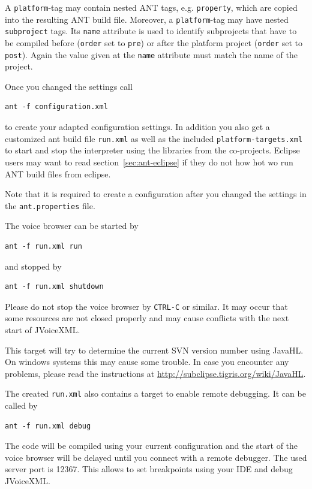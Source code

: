 \documentclass[11pt,a4paper]{article}
\begin{document}
A \lstinline{platform}-tag may contain nested ANT tags, e.g.
\lstinline{property}, which are copied into the resulting ANT build file. Moreover, a \lstinline{platform}-tag
may have nested \lstinline{subproject} tags. Its \lstinline{name} attribute
is used to identify subprojects that have to be compiled before
(\lstinline{order} set to \texttt{pre}) or after the platform project
(\lstinline{order} set to \texttt{post}). Again the value given at the
\lstinline{name} attribute must match the name of the project.

Once you changed the settings call
\begin{lstlisting}
ant -f configuration.xml
\end{lstlisting}
to create your adapted configuration settings. In addition you also get
a customized ant build file \texttt{run.xml} as well as the included
\texttt{platform-targets.xml} to start and
stop the interpreter using the libraries from the co-projects.
Eclipse users may want to read section~\ref{sec:ant-eclipse} if they do
not how hot wo run ANT build files from eclipse. 

Note that it is required to create a configuration after you changed the
settings in the \texttt{ant.properties} file.

The voice browser can be started by
\begin{lstlisting}
ant -f run.xml run
\end{lstlisting}
and stopped by
\begin{lstlisting}
ant -f run.xml shutdown
\end{lstlisting}

Please do not stop the voice browser by \texttt{CTRL-C} or similar. It may occur
that some resources are not closed properly and may cause conflicts with the next
start of JVoiceXML.

This target will try to determine the current SVN version number using JavaHL. On
windows systems this may cause some trouble. In case you encounter any problems,
please read the instructions at \url{http://subclipse.tigris.org/wiki/JavaHL}.

The created \texttt{run.xml} also contains a target to enable remote
debugging. It can be called by
\begin{lstlisting}
ant -f run.xml debug
\end{lstlisting}
The code will be compiled using your current configuration and the start of the
voice browser will be delayed until you connect with a remote debugger. The
used server port is 12367. This allows to set breakpoints using your IDE and
debug JVoiceXML.
\end{document}
